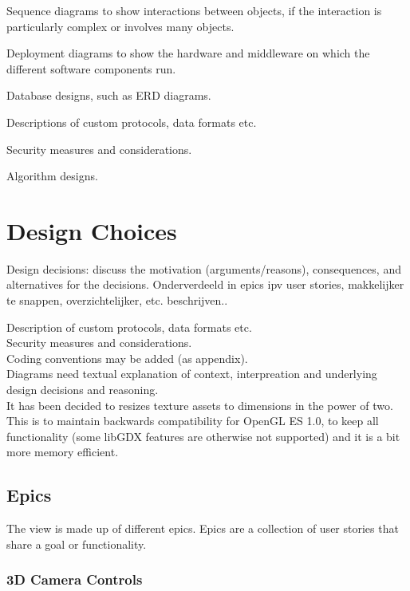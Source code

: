 \documentclass[10pt]{extarticle} %
\begin{document}
    Sequence diagrams to show interactions between objects, if the interaction is particularly complex or involves many objects.

    Deployment diagrams to show the hardware and middleware on which the different software components run.

    Database designs, such as ERD diagrams.

    Descriptions of custom protocols, data formats etc.

    Security measures and considerations.

    Algorithm designs.

    \newpage

    \section{Design Choices}
    Design decisions: discuss the motivation (arguments/reasons), consequences,
    and alternatives for the decisions.
    Onderverdeeld in epics ipv user stories, makkelijker te snappen, overzichtelijker, etc. beschrijven..

    Description of custom protocols, data formats etc.\\
    Security measures and considerations.\\
    Coding conventions may be added (as appendix).\\
    Diagrams need textual explanation of context, interpreation and underlying design decisions and reasoning.\\

    It has been decided to resizes texture assets to dimensions in the power of two.
    This is to maintain backwards compatibility for OpenGL ES 1.0, to keep all functionality (some libGDX features are otherwise not supported) and it is a bit more memory efficient.\cite{libgdxpottex}

    \subsection{Epics}
    The view is made up of different epics.
    Epics are a collection of user stories that share a goal or functionality.

    \subsubsection{3D Camera Controls}
\end{document}
